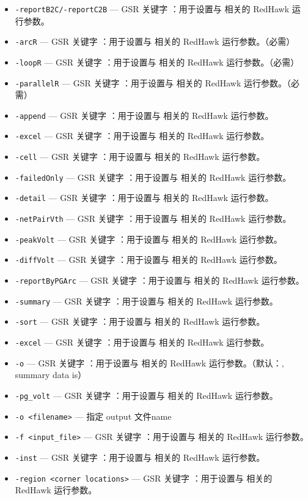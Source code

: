 \begin{itemize}
\item \texttt{-reportB2C/-reportC2B} — GSR 关键字 ：用于设置与  相关的 RedHawk 运行参数。
\item \texttt{-arcR} — GSR 关键字 ：用于设置与  相关的 RedHawk 运行参数。（必需）
\item \texttt{-loopR} — GSR 关键字 ：用于设置与  相关的 RedHawk 运行参数。（必需）
\item \texttt{-parallelR} — GSR 关键字 ：用于设置与  相关的 RedHawk 运行参数。（必需）
\item \texttt{-append} — GSR 关键字 ：用于设置与  相关的 RedHawk 运行参数。
\item \texttt{-excel} — GSR 关键字 ：用于设置与  相关的 RedHawk 运行参数。
\item \texttt{-cell} — GSR 关键字 ：用于设置与  相关的 RedHawk 运行参数。
\item \texttt{-failedOnly} — GSR 关键字 ：用于设置与  相关的 RedHawk 运行参数。
\item \texttt{-detail} — GSR 关键字 ：用于设置与  相关的 RedHawk 运行参数。
\item \texttt{-netPairVth} — GSR 关键字 ：用于设置与  相关的 RedHawk 运行参数。
\item \texttt{-peakVolt} — GSR 关键字 ：用于设置与  相关的 RedHawk 运行参数。
\item \texttt{-diffVolt} — GSR 关键字 ：用于设置与  相关的 RedHawk 运行参数。
\item \texttt{-reportByPGArc} — GSR 关键字 ：用于设置与  相关的 RedHawk 运行参数。
\item \texttt{-summary} — GSR 关键字 ：用于设置与  相关的 RedHawk 运行参数。
\item \texttt{-sort} — GSR 关键字 ：用于设置与  相关的 RedHawk 运行参数。
\item \texttt{-excel} — GSR 关键字 ：用于设置与  相关的 RedHawk 运行参数。
\item \texttt{-o} — GSR 关键字 ：用于设置与  相关的 RedHawk 运行参数。（默认：, summary data is）
\item \texttt{-pg\_volt} — GSR 关键字 ：用于设置与  相关的 RedHawk 运行参数。
\item \texttt{-o <filename>} — 指定 output 文件name
\item \texttt{-f <input\_file>} — GSR 关键字 ：用于设置与  相关的 RedHawk 运行参数。
\item \texttt{-inst} — GSR 关键字 ：用于设置与  相关的 RedHawk 运行参数。
\item \texttt{-region <corner locations>} — GSR 关键字 ：用于设置与  相关的 RedHawk 运行参数。

\end{itemize}
